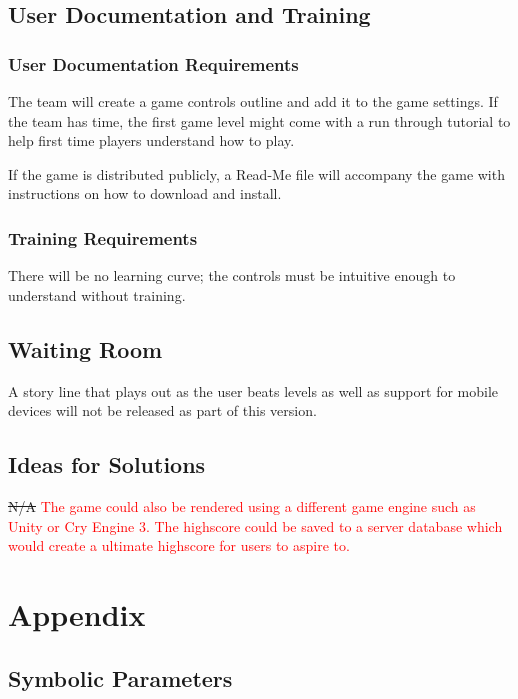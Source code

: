 \documentclass[12pt, titlepage]{article}
\begin{document}
\subsection{User Documentation and Training}
\subsubsection{User Documentation Requirements}
The team will create a game controls outline and add it to the game settings. If the team has time, the first game level might come with a run through tutorial to help first time players understand how to play.

If the game is distributed publicly, a Read-Me file will accompany the game with instructions on how to download and install.

\subsubsection{Training Requirements}
There will be no learning curve; the controls must be intuitive enough to understand without training.

\subsection{Waiting Room}
A story line that plays out as the user beats levels as well as support for mobile devices will not be released as part of this version.

\subsection{Ideas for Solutions}
\sout{N/A} \textcolor{red}{The game could also be rendered using a different game engine such as Unity or Cry Engine 3. The highscore could be saved to a server database which would create a ultimate highscore for users to aspire to.}





\newpage

\section{Appendix}

\subsection{Symbolic Parameters}
\end{document}
